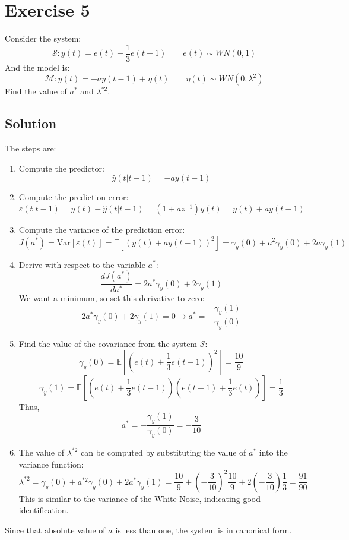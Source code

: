 \section{Exercise 5}

Consider the system: 
\[\mathcal{S}:y(t)=e(t)+\dfrac{1}{3}e(t-1)\qquad e(t)\sim WN(0,1)\]
And the model is: 
\[\mathcal{M}:y(t)=-ay(t-1)+\eta(t)\qquad \eta(t)\sim WN(0,\lambda^2)\]
Find the value of $a^\ast$ and $\lambda^{\ast 2}$. 

\subsection*{Solution}
The steps are: 
\begin{enumerate}
    \item Compute the predictor: 
        \[\hat{y}(t|t-1)=-ay(t-1)\]
    \item Compute the prediction error: 
        \[\varepsilon(t|t-1)=y(t)-\hat{y}(t|t-1)=(1+az^{-1})y(t)=y(t)+ay(t-1)\]
    \item Compute the variance of the prediction error: 
        \[\bar{J}(a^{\ast})=\text{Var}\left[\varepsilon(t)\right]=\mathbb{E}\left[ {\left(y(t)+ay(t-1)\right)}^2 \right]=\gamma_y(0)+a^2\gamma_y(0)+2a\gamma_y(1)\]
    \item Derive with respect to the variable $a^{\ast}$: 
        \[\dfrac{d\bar{J}(a^{\ast})}{da^{\ast}}=2a^{\ast}\gamma_y(0)+2\gamma_y(1)\]
        We want a minimum, so set this derivative to zero:
        \[2a^{\ast}\gamma_y(0)+2\gamma_y(1)=0\rightarrow a^{\ast}=-\dfrac{\gamma_y(1)}{\gamma_y(0)}\]
    \item Find the value of the covariance from the system $\mathcal{S}$: 
        \[\gamma_y(0)=\mathbb{E}\left[{\left( e(t)+\dfrac{1}{3}e(t-1) \right)}^2\right]=\dfrac{10}{9}\]
        \[\gamma_y(1)=\mathbb{E}\left[\left( e(t)+\dfrac{1}{3}e(t-1) \right)\left( e(t-1)+\dfrac{1}{3}e(t) \right)\right]=\dfrac{1}{3}\]
        Thus,
        \[a^\ast=-\dfrac{\gamma_y(1)}{\gamma_y(0)}=-\dfrac{3}{10}\]
    \item The value of $\lambda^{\ast 2}$ can be computed by substituting the value of $a^\ast$ into the variance function: 
        \[\lambda^{\ast 2}=\gamma_y(0)+a^{\ast 2}\gamma_y(0)+2a^\ast\gamma_y(1)=\dfrac{10}{9}+{\left(-\dfrac{3}{10}\right)}^2\dfrac{10}{9}+2\left(-\dfrac{3}{10}\right)\dfrac{1}{3}=\dfrac{91}{90}\]
        This is similar to the variance of the  White Noise, indicating good identification.
\end{enumerate}
Since that absolute value of $a$ is less than one, the system is in canonical form.